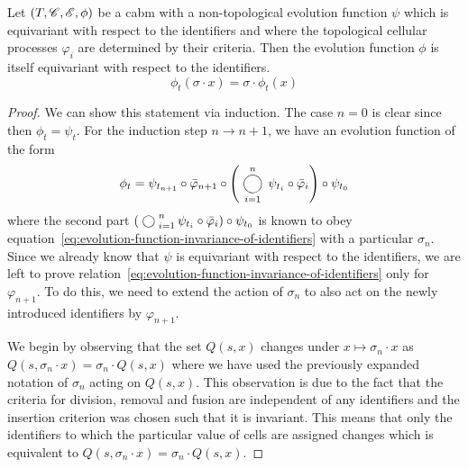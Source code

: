 \begin{theorem}
    Let $(T,\mathscr{C},\mathscr{E},\phi)$ be a \ac{cabm} with a non-topological evolution function $\psi$ which is
    equivariant with respect to the identifiers and where the topological cellular processes
    $\varphi_i$ are determined by their criteria.
    Then the evolution function $\phi$ is itself equivariant with respect to the identifiers.
    \begin{equation}
        \phi_t(\sigma\cdot x) = \sigma\cdot\phi_t(x)
        \label{eq:evolution-function-invariance-of-identifiers}
    \end{equation}
    \label{theorem:identifier-independent-dynamics}
\end{theorem}
\begin{proof}
    We can show this statement via induction.
    The case $n=0$ is clear since then $\phi_t=\psi_t$.
    For the induction step $n\rightarrow n+1$, we have an evolution function of the form
    \begin{equation}
        \phi_t = \psi_{t_{n+1}}\circ\bar{\varphi}_{n+1}\circ
            \left(\bigcomp^n_{i=1}\psi_{t_i}\circ\bar{\varphi}_i\right)\circ\psi_{t_0}
    \end{equation}
    where the second part $(\bigcomp_{i=1}^n\psi_{t_i}\circ\bar{\varphi}_i)\circ\psi_{t_0}$ is known
    to obey equation~\eqref{eq:evolution-function-invariance-of-identifiers} with a particular
    $\sigma_n$.
    Since we already know that $\psi$ is equivariant with respect to the identifiers, we
    are left to prove relation~\eqref{eq:evolution-function-invariance-of-identifiers}
    only for $\varphi_{n+1}$.
    To do this, we need to extend the action of $\sigma_n$ to also act on the newly introduced
    identifiers by $\varphi_{n+1}$.

    We begin by observing that the set $Q(s,x)$ changes under $x\mapsto\sigma_n\cdot x$ as
    $Q(s,\sigma_n\cdot x)=\sigma_n\cdot Q(s,x)$ where we have used the previously expanded notation
    of $\sigma_n$ acting on $Q(s,x)$.
    This observation is due to the fact that the criteria for division, removal and fusion are
    independent of any identifiers and the insertion criterion was chosen such that it is invariant.
    This means that only the identifiers to which the particular value of cells are assigned changes
    which is equivalent to $Q(s,\sigma_n\cdot x)=\sigma_n\cdot Q(s,x)$.


\end{proof}
